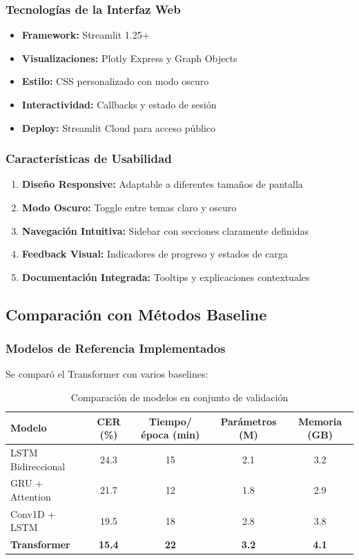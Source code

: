 \documentclass[12pt,a4paper]{article}
\begin{document}
\subsubsection{Tecnologías de la Interfaz Web}
\begin{itemize}
    \item \textbf{Framework:} Streamlit 1.25+ 
    \item \textbf{Visualizaciones:} Plotly Express y Graph Objects
    \item \textbf{Estilo:} CSS personalizado con modo oscuro
    \item \textbf{Interactividad:} Callbacks y estado de sesión
    \item \textbf{Deploy:} Streamlit Cloud para acceso público
\end{itemize}

\subsubsection{Características de Usabilidad}
\begin{enumerate}
    \item \textbf{Diseño Responsive:} Adaptable a diferentes tamaños de pantalla
    \item \textbf{Modo Oscuro:} Toggle entre temas claro y oscuro
    \item \textbf{Navegación Intuitiva:} Sidebar con secciones claramente definidas
    \item \textbf{Feedback Visual:} Indicadores de progreso y estados de carga
    \item \textbf{Documentación Integrada:} Tooltips y explicaciones contextuales
\end{enumerate}

\subsection{Comparación con Métodos Baseline}

\subsubsection{Modelos de Referencia Implementados}
Se comparó el Transformer con varios baselines:

\begin{table}[H]
\centering
\begin{tabular}{|l|c|c|c|c|}
\hline
\textbf{Modelo} & \textbf{CER (\%)} & \textbf{Tiempo/época (min)} & \textbf{Parámetros (M)} & \textbf{Memoria (GB)} \\
\hline
LSTM Bidireccional & 24.3 & 15 & 2.1 & 3.2 \\
\hline
GRU + Attention & 21.7 & 12 & 1.8 & 2.9 \\
\hline
Conv1D + LSTM & 19.5 & 18 & 2.8 & 3.8 \\
\hline
\textbf{Transformer} & \textbf{15.4} & \textbf{22} & \textbf{3.2} & \textbf{4.1} \\
\hline
\end{tabular}
\caption{Comparación de modelos en conjunto de validación}
\end{table}
\end{document}
